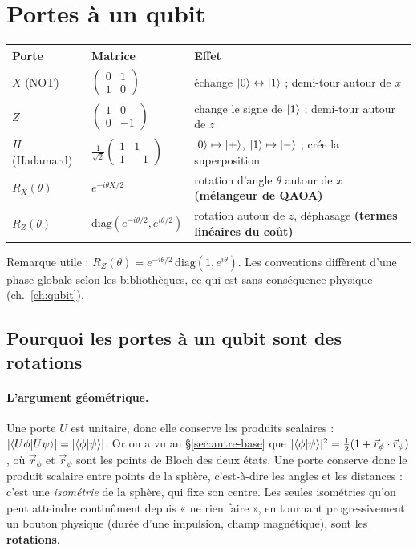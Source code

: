 \section{Portes à un qubit}
\begin{center}
\renewcommand{\arraystretch}{1.25}
\begin{tabular}{llp{7.3cm}}
\toprule
Porte & Matrice & Effet\\
\midrule
$X$ (NOT) & $\begin{pmatrix}0&1\\1&0\end{pmatrix}$ & échange $\lvert 0\rangle\leftrightarrow\lvert 1\rangle$ ; demi-tour autour de $x$\\
$Z$ & $\begin{pmatrix}1&0\\0&-1\end{pmatrix}$ & change le signe de $\lvert 1\rangle$ ; demi-tour autour de $z$\\
$H$ (Hadamard) & $\tfrac1{\sqrt2}\begin{pmatrix}1&1\\1&-1\end{pmatrix}$ & $\lvert 0\rangle\mapsto\lvert +\rangle$, $\lvert 1\rangle\mapsto\lvert -\rangle$ ; crée la superposition\\
$R_X(\theta)$ & $e^{-i\theta X/2}$ & rotation d'angle $\theta$ autour de $x$ \textbf{(mélangeur de QAOA)}\\
$R_Z(\theta)$ & $\mathrm{diag}(e^{-i\theta/2},e^{i\theta/2})$ & rotation autour de $z$, déphasage \textbf{(termes linéaires du coût)}\\
\bottomrule
\end{tabular}
\end{center}
Remarque utile : $R_Z(\theta)=e^{-i\theta/2}\,\mathrm{diag}(1,e^{i\theta})$. Les conventions diffèrent d'une phase globale selon les bibliothèques, ce qui est sans conséquence physique (ch.~\ref{ch:qubit}).

\subsection*{Pourquoi les portes à un qubit sont des rotations}
\paragraph{L'argument géométrique.} Une porte $U$ est unitaire, donc elle conserve les produits scalaires : $|\langle U\phi\vert U\psi\rangle|=|\langle \phi\vert \psi\rangle|$. Or on a vu au §\ref{sec:autre-base} que $|\langle \phi\vert \psi\rangle|^2=\tfrac12(1+\vec r_\phi\cdot\vec r_\psi)$, où $\vec r_\phi$ et $\vec r_\psi$ sont les points de Bloch des deux états. Une porte conserve donc le produit scalaire entre points de la sphère, c'est-à-dire les angles et les distances : c'est une \emph{isométrie} de la sphère, qui fixe son centre. Les seules isométries qu'on peut atteindre continûment depuis « ne rien faire », en tournant progressivement un bouton physique (durée d'une impulsion, champ magnétique), sont les \textbf{rotations}.

